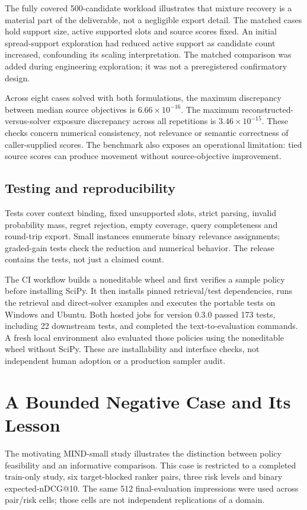 \documentclass[runningheads]{llncs}
\begin{document}
The fully covered 500-candidate workload illustrates that mixture recovery is
a material part of the deliverable, not a negligible export detail.
The matched cases hold support size, active supported slots and source scores
fixed. An initial spread-support exploration had reduced active support as
candidate count increased, confounding its scaling interpretation. The matched
comparison was added during engineering exploration; it was not a preregistered
confirmatory design.

Across eight cases solved with both formulations, the maximum discrepancy
between median source objectives is $6.66\times10^{-16}$.
The maximum reconstructed-versus-solver exposure discrepancy across all
repetitions is $3.46\times10^{-15}$. These checks concern numerical consistency,
not relevance or semantic correctness of caller-supplied scores.
The benchmark also exposes an operational limitation: tied source scores
can produce movement without source-objective improvement.

\subsection{Testing and reproducibility}
Tests cover context binding, fixed unsupported slots, strict parsing, invalid
probability mass, regret rejection, empty coverage, query completeness and
round-trip export. Small instances enumerate binary relevance assignments;
graded-gain tests check the reduction and numerical behavior. The release
contains the tests, not just a claimed count.

The CI workflow builds a noneditable wheel and first verifies a sample policy
before installing SciPy. It then installs pinned retrieval/test dependencies,
runs the retrieval and direct-solver examples and executes the portable tests
on Windows and Ubuntu. Both hosted jobs for version 0.3.0 passed 173 tests,
including 22 downstream tests, and completed the text-to-evaluation commands.
A fresh local environment also evaluated those policies using the noneditable
wheel without SciPy. These are installability and interface checks, not
independent human adoption or a production sampler audit.

\section{A Bounded Negative Case and Its Lesson}
The motivating MIND-small study \cite{mind} illustrates the distinction between
policy feasibility and an informative comparison. This case is restricted to
a completed train-only study, six target-blocked ranker pairs, three risk levels
and binary expected-nDCG@10. The same 512 final-evaluation impressions were used
across pair/risk cells; those cells are not independent replications of a domain.
\end{document}
